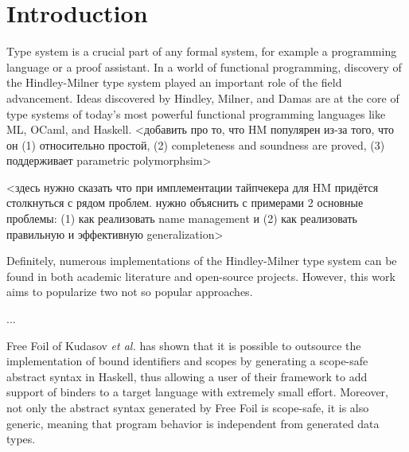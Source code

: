\chapter{Introduction}
\label{chap:intro}


Type system is a crucial part of any formal system, for example a programming language or a proof assistant. In a world of functional programming, discovery of the Hindley-Milner type system played an important role of the field advancement. Ideas discovered by Hindley, Milner, and Damas are at the core of type systems of today's most powerful functional programming languages like ML, OCaml, and Haskell. <добавить про то, что HM популярен из-за того, что он (1) относительно простой, (2) completeness and soundness are proved, (3) поддерживает parametric polymorphsim>

<здесь нужно сказать что при имплементации тайпчекера для HM придётся столкнуться с рядом проблем. нужно объяснить с примерами 2 основные проблемы: (1) как реализовать name management и (2) как реализовать правильную и эффективную generalization>

Definitely, numerous implementations of the Hindley-Milner type system can be found in both academic literature and open-source projects. However, this work aims to popularize two not so popular approaches.

...

Free Foil of Kudasov \textit{et al.} \cite{FreeFoil} has shown that it is possible to outsource the implementation of bound identifiers and scopes by generating a scope-safe abstract syntax in Haskell, thus allowing a user of their framework to add support of binders to a target language with extremely small effort. Moreover, not only the abstract syntax generated by Free Foil is scope-safe, it is also generic, meaning that program behavior is independent from generated data types.

